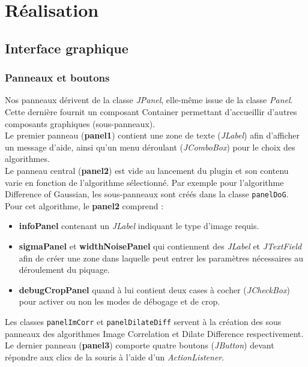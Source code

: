 \chapter{Réalisation}

\section{Interface graphique}

\subsection{Panneaux et boutons}

Nos panneaux dérivent de la classe \emph{JPanel}, elle-même issue de la classe \emph{Panel}. Cette dernière fournit un composant Container permettant d'accueillir d'autres composants graphiques (sous-panneaux).\\

Le premier panneau (\textbf{panel1}) contient une zone de texte (\emph{JLabel}) afin d'afficher un message d'aide, ainsi qu'un menu déroulant (\emph{JComboBox}) pour le choix des algorithmes. \\

Le panneau central (\textbf{panel2}) est vide au lancement du plugin et son contenu varie en fonction de l'algorithme sélectionné. Par exemple pour l'algorithme Difference of Gaussian, les sous-panneaux sont créés dans la classe \texttt{panelDoG}. Pour cet algorithme, le \textbf{panel2} comprend :
\begin{itemize}
\item \textbf{infoPanel} contenant un \emph{JLabel} indiquant le type d'image requis.
\item \textbf{sigmaPanel} et \textbf{widthNoisePanel} qui contiennent des \emph{JLabel} et \emph{JTextField} afin de créer une zone dans laquelle peut entrer les paramètres nécessaires au déroulement du piquage. 
\item \textbf{debugCropPanel} quand à lui contient deux cases à cocher (\emph{JCheckBox}) pour activer ou non les modes de débogage et de crop. 
\end{itemize}
Les classes \texttt{panelImCorr} et \texttt{panelDilateDiff} servent à la création des sous panneaux des algorithmes Image Correlation et Dilate Difference respectivement. \\

Le dernier panneau (\textbf{panel3}) comporte quatre boutons (\emph{JButton}) devant répondre aux clics de la souris à l'aide d'un \emph{ActionListener}. \\

